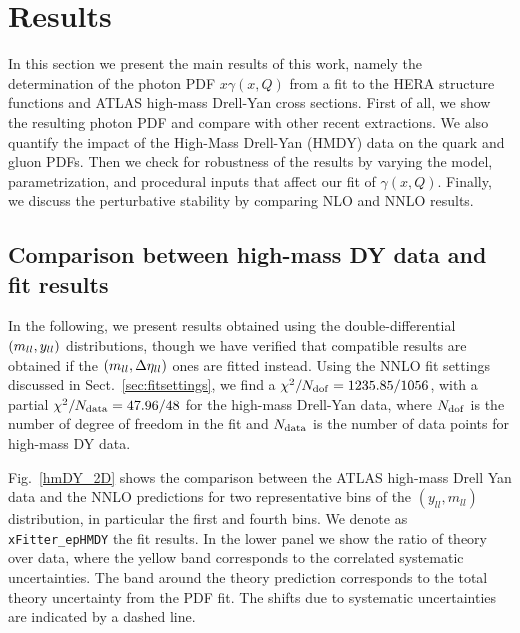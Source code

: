 \section{Results}
\label{sec:results}

In this section we present the main results of this work, namely the
determination of the photon PDF $x\gamma(x,Q)$ from a fit to the
HERA structure functions and ATLAS high-mass Drell-Yan cross sections.
%
First of all, we show the resulting photon PDF and compare with other
recent extractions.
%
We also quantify the impact of the High-Mass Drell-Yan (HMDY) data on
the quark and gluon PDFs.
%
Then we check for robustness of the results by varying the model, parametrization, and procedural
inputs that affect our fit of $\gamma(x,Q)$.
%
Finally, we discuss the perturbative stability by comparing NLO and
NNLO results.

\subsection{Comparison between high-mass DY data and fit results}

In the following, we present results obtained using the
double-differential $\left( m_{ll},y_{ll}\right)$ distributions, though we
have verified that compatible results are obtained if the
$\left( m_{ll},\Delta\eta_{ll}\right)$ ones are fitted instead.
%
Using the NNLO fit settings discussed in Sect.~\ref{sec:fitsettings},
we find a $\chi^{2}/N_{\rm dof} = 1235.85/1056$, with a partial
$\chi^2/N_{\rm data} = 47.96/48$ for the high-mass Drell-Yan data,
where $N_{\rm dof}$ is the number of degree of freedom in the fit and 
$N_{\rm data}$  is the number of data points for high-mass DY data.

Fig.~\ref{hmDY_2D} shows the comparison between the ATLAS
high-mass Drell Yan data and the NNLO predictions for two
representative bins of the $(y_{ll},m_{ll})$ distribution, in
particular the first and fourth bins.
%
We denote as {\tt xFitter\_epHMDY} the fit results.
%
In the lower panel we show the ratio of theory over data, where the
yellow band corresponds to the correlated systematic uncertainties.
%
The band around the theory prediction corresponds to the total theory
uncertainty from the PDF fit. 
%
The shifts due to systematic uncertainties are indicated by a dashed
line.

